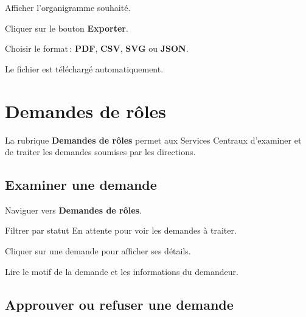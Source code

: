 \begin{steps}
  \item Afficher l'organigramme souhait\'e.
  \item Cliquer sur le bouton \textbf{Exporter}.
  \item Choisir le format\,: \textbf{PDF}, \textbf{CSV}, \textbf{SVG} ou \textbf{JSON}.
  \item Le fichier est t\'el\'echarg\'e automatiquement.
\end{steps}


\section{Demandes de r\^oles}

La rubrique \textbf{Demandes de r\^oles} permet aux Services Centraux d'examiner et de traiter les demandes soumises par les directions.


\subsection{Examiner une demande}

\begin{steps}
  \item Naviguer vers \textbf{Demandes de r\^oles}.
  \item Filtrer par statut \og En attente \fg{} pour voir les demandes \`a traiter.
  \item Cliquer sur une demande pour afficher ses d\'etails.
  \item Lire le motif de la demande et les informations du demandeur.
\end{steps}

\subsection{Approuver ou refuser une demande}


